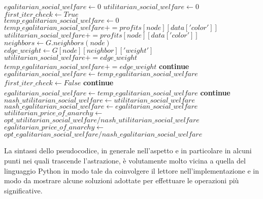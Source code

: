 \begin{algorithmic}
	\State $egalitarian\_social\_welfare\gets 0$
	\State $utilitarian\_social\_welfare\gets 0$
	\State $first\_iter\_check\gets True$ \\

		\State $temp\_egalitarian\_social\_welfare\gets 0$
		\State $temp\_egalitarian\_social\_welfare += profits[node][data['color']]$
		\State $utilitarian\_social\_welfare += profits[node][data['color']]$
		\State $neighbors\gets G.neighbors(node)$
				\State $edge\_weight\gets G[node][neighbor]['weight']$
				\State $utilitarian\_social\_welfare += edge\_weight$
				\State $temp\_egalitarian\_social\_welfare += edge\_weight$
			\Else
				\State \textbf{continue}
			\EndIf
				\State $egalitarian\_social\_welfare\gets temp\_egalitarian\_social\_welfare$
				\State $first\_iter\_check\gets False$
				\State \textbf{continue}
			\EndIf
				\State $egalitarian\_social\_welfare\gets temp\_egalitarian\_social\_welfare$
			\Else
				\State \textbf{continue}
			\EndIf
		\EndFor
	\EndFor \\

	\State $nash\_utilitarian\_social\_welfare\gets utilitarian\_social\_welfare$
	\State $nash\_egalitarian\_social\_welfare\gets egalitarian\_social\_welfare$ \\

		\State $utilitarian\_price\_of\_anarchy\gets$ \\
		$opt\_utilitarian\_social\_welfare / nash\_utilitarian\_social\_welfare$
	\EndIf
		\State $egalitarian\_price\_of\_anarchy\gets$ \\
		$opt\_egalitarian\_social\_welfare / nash\_egalitarian\_social\_welfare$
	\EndIf \\
\EndIf 

\end{algorithmic}

\newpage
La sintassi dello pseudocodice, in generale nell'aspetto e in particolare in alcuni punti nei quali trascende l'astrazione, è volutamente molto vicina a quella del linguaggio Python in modo tale da coinvolgere il lettore nell'implementazione e in modo da mostrare alcune soluzioni adottate per effettuare le operazioni più significative.\\


